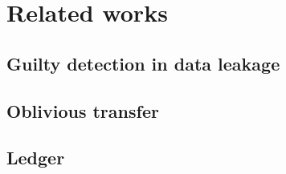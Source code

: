 \section{Related works}
\subsection{Guilty detection in data leakage}

\subsection{Oblivious transfer}

\subsection{Ledger}

